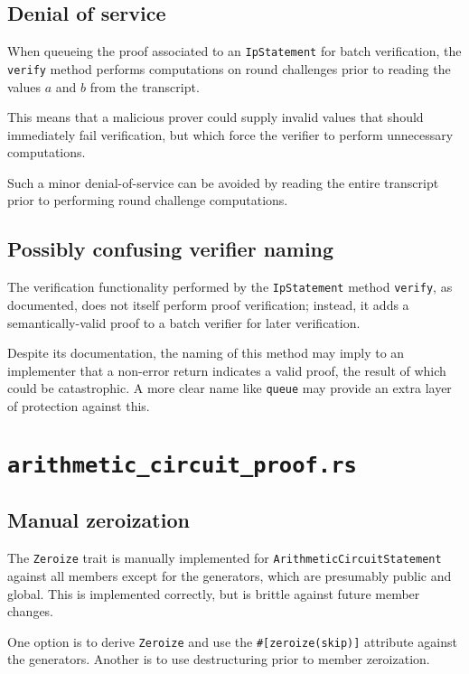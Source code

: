 \documentclass{article}
\begin{document}
\subsection{Denial of service}

When queueing the proof associated to an \texttt{IpStatement} for batch verification, the \texttt{verify} method performs computations on round challenges prior to reading the values $a$ and $b$ from the transcript.

This means that a malicious prover could supply invalid values that should immediately fail verification, but which force the verifier to perform unnecessary computations.

Such a minor denial-of-service can be avoided by reading the entire transcript prior to performing round challenge computations.


\subsection{Possibly confusing verifier naming}

The verification functionality performed by the \texttt{IpStatement} method \texttt{verify}, as documented, does not itself perform proof verification; instead, it adds a semantically-valid proof to a batch verifier for later verification.

Despite its documentation, the naming of this method may imply to an implementer that a non-error return indicates a valid proof, the result of which could be catastrophic.
A more clear name like \texttt{queue} may provide an extra layer of protection against this.


\section{\texttt{arithmetic\_circuit\_proof.rs}}

\subsection{Manual zeroization}

The \texttt{Zeroize} trait is manually implemented for \texttt{ArithmeticCircuitStatement} against all members except for the generators, which are presumably public and global.
This is implemented correctly, but is brittle against future member changes.

One option is to derive \texttt{Zeroize} and use the \texttt{\#[zeroize(skip)]} attribute against the generators.
Another is to use destructuring prior to member zeroization.
\end{document}

